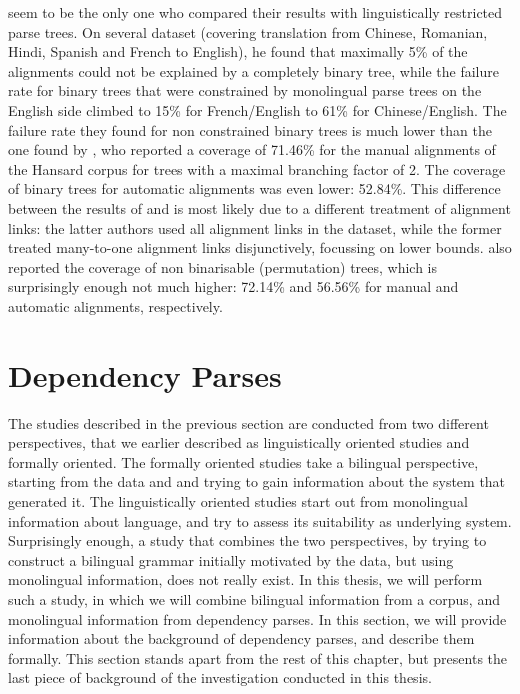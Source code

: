 \documentclass{report}
\begin{document}
\cite{wellington2006empirical} seem to be the only one who compared their results with linguistically restricted parse trees. On several dataset (covering translation from Chinese, Romanian, Hindi, Spanish and French to English), he found that maximally 5\% of the alignments could not be explained by a completely binary tree, while the failure rate for binary trees that were constrained by monolingual parse trees on the English side climbed to 15\% for French/English to 61\% for Chinese/English. The failure rate they found for non constrained binary trees is much lower than the one found by \cite{simaan2013hats}, who reported a coverage of 71.46\% for the manual alignments of the Hansard corpus for trees with a maximal branching factor of 2. The coverage of binary trees for automatic alignments was even lower: 52.84\%. This difference between the results of \cite{wellington2006empirical} and \cite{simaan2013hats} is most likely due to a different treatment of alignment links: the latter authors used all alignment links in the dataset, while the former treated many-to-one alignment links disjunctively, focussing on lower bounds. \cite{simaan2013hats} also reported the coverage of non binarisable (permutation) trees, which is surprisingly enough not much higher: 72.14\% and 56.56\% for manual and automatic alignments, respectively.


\section{Dependency Parses}

The studies described in the previous section are conducted from two different perspectives, that we earlier described as linguistically oriented studies and formally oriented. The formally oriented studies take a bilingual perspective, starting from the data and and trying to gain information about the system that generated it. The linguistically oriented studies start out from monolingual information about language, and try to assess its suitability as underlying system. Surprisingly enough, a study that combines the two perspectives, by trying to construct a bilingual grammar initially motivated by the data, but using monolingual information, does not really exist. In this thesis, we will perform such a study, in which we will combine bilingual information from a corpus, and monolingual information from dependency parses. In this section, we will provide information about the background of dependency parses, and describe them formally. This section stands apart from the rest of this chapter, but presents the last piece of background of the investigation conducted in this thesis.
\end{document}
